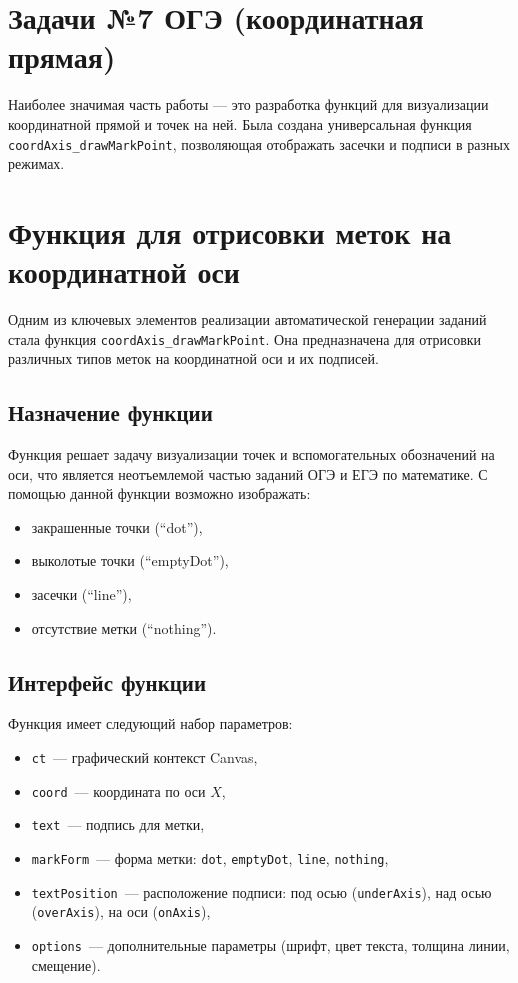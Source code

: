 \section{Задачи №7 ОГЭ (координатная прямая)}

Наиболее значимая часть работы — это разработка функций для визуализации координатной прямой и точек на ней. 
Была создана универсальная функция \texttt{coordAxis\_drawMarkPoint}, позволяющая отображать засечки и подписи в разных режимах.
\section{Функция для отрисовки меток на координатной оси}

Одним из ключевых элементов реализации автоматической генерации заданий
стала функция \texttt{coordAxis\_drawMarkPoint}. Она предназначена для
отрисовки различных типов меток на координатной оси и их подписей.

\subsection{Назначение функции}
Функция решает задачу визуализации точек и вспомогательных обозначений на оси,
что является неотъемлемой частью заданий ОГЭ и ЕГЭ по математике.
С помощью данной функции возможно изображать:
\begin{itemize}
    \item закрашенные точки (``dot''),
    \item выколотые точки (``emptyDot''),
    \item засечки (``line''),
    \item отсутствие метки (``nothing'').
\end{itemize}

\subsection{Интерфейс функции}
Функция имеет следующий набор параметров:
\begin{itemize}
    \item \texttt{ct}~--- графический контекст Canvas,
    \item \texttt{coord}~--- координата по оси $X$,
    \item \texttt{text}~--- подпись для метки,
    \item \texttt{markForm}~--- форма метки: \texttt{dot}, \texttt{emptyDot}, \texttt{line}, \texttt{nothing},
    \item \texttt{textPosition}~--- расположение подписи: под осью (\texttt{underAxis}), над осью (\texttt{overAxis}), на оси (\texttt{onAxis}),
    \item \texttt{options}~--- дополнительные параметры (шрифт, цвет текста, толщина линии, смещение).
\end{itemize}

